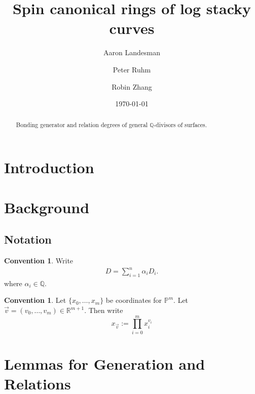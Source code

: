 \documentclass{amsart}
\title{Spin canonical rings of log stacky curves}
\author{Aaron Landesman}
\author{Peter Ruhm}
\author{Robin Zhang}
\date{\today}
\theoremstyle{plain}
\theoremstyle{definition}
\newtheorem{convention}[thm]{Convention}
\theoremstyle{remark}
\numberwithin{equation}{section}
\newcommand\ssec{\subsection}
\newcommand\br{{\mathbb R}}
\newcommand\bq{{\mathbb Q}}
\newcommand\bp{{\mathbb P}}
\begin{document}
\begin{abstract}
 	Bonding generator and relation degrees of general $\bq$-divisors
	of surfaces.
\end{abstract}

\maketitle


\section{Introduction}

\section{Background}

\ssec{Notation}
\begin{convention}
Write
\begin{align*}
	D = \sum_{i=1}^{n}\alpha_i D_i.
\end{align*}
where $\alpha_i \in \bq$.
\end{convention}

\begin{convention}
Let $\{x_0, \ldots, x_m\}$ be coordinates for $\bp^m$. Let
$\vec{v} = (v_0, \ldots, v_m) \in \br^{m + 1}$. Then write
\[
	x_{\vec{v}} := \prod_{i = 0}^{m} x_i^{v_i}
\]
\end{convention}

\section{Lemmas for Generation and Relations}
\end{document}
